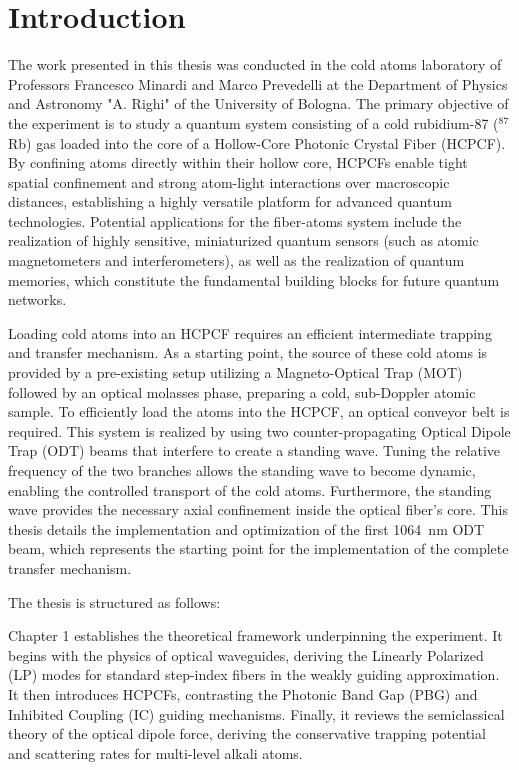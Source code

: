 \documentclass[../../thesis_main.tex]{subfiles}
\begin{document}
    \chapter*{Introduction}

    
    The work presented in this thesis was conducted in the cold atoms laboratory of Professors Francesco Minardi and Marco Prevedelli at the Department of Physics and Astronomy "A. Righi" of the University of Bologna. The primary objective of the experiment is to study a quantum system consisting of a cold rubidium-87 ($^{87}$Rb) gas loaded into the core of a Hollow-Core Photonic Crystal Fiber (HCPCF).
    By confining atoms directly within their hollow core, HCPCFs enable tight spatial confinement and strong atom-light interactions over macroscopic distances, establishing a highly versatile platform for advanced quantum technologies.
    Potential applications for the fiber-atoms system include the realization of highly sensitive, miniaturized quantum sensors (such as atomic magnetometers and interferometers), as well as the realization of quantum memories, which constitute the fundamental building blocks for future quantum networks.
    
    Loading cold atoms into an HCPCF requires an efficient intermediate trapping and transfer mechanism. As a starting point, the source of these cold atoms is provided by a pre-existing setup utilizing a Magneto-Optical Trap (MOT) followed by an optical molasses phase, preparing a cold, sub-Doppler atomic sample. To efficiently load the atoms into the HCPCF, an optical conveyor belt is required. This system is realized by using two counter-propagating Optical Dipole Trap (ODT) beams that interfere to create a standing wave. Tuning the relative frequency of the two branches allows the standing wave to become dynamic, enabling the controlled transport of the cold atoms. Furthermore, the standing wave provides the necessary axial confinement inside the optical fiber's core. This thesis details the implementation and optimization of the first 1064~nm ODT beam, which represents the starting point for the implementation of the complete transfer mechanism.

    The thesis is structured as follows:

    Chapter 1 establishes the theoretical framework underpinning the experiment. It begins with the physics of optical waveguides, deriving the Linearly Polarized (LP) modes for standard step-index fibers in the weakly guiding approximation. It then introduces HCPCFs, contrasting the Photonic Band Gap (PBG) and Inhibited Coupling (IC) guiding mechanisms. Finally, it reviews the semiclassical theory of the optical dipole force, deriving the conservative trapping potential and scattering rates for multi-level alkali atoms.
\end{document}
